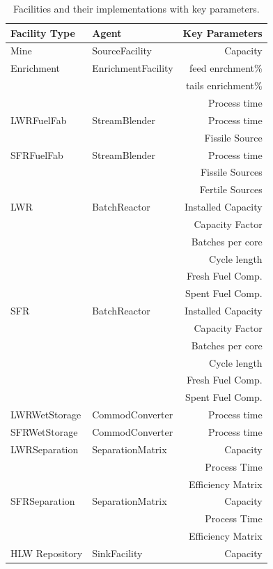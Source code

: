 \begin{table}
\centering
\begin{tabular}{|l|l|r|}
\hline
\textbf{Facility Type} &\textbf{Agent} & \textbf{Key Parameters}\\
\hline
Mine & SourceFacility & Capacity\\
\hline
Enrichment & EnrichmentFacility & feed enrchment\% \\
& & tails enrichment\% \\
& & Process time \\
\hline
LWRFuelFab & StreamBlender & Process time\\
& & Fissile Source\\
\hline
SFRFuelFab & StreamBlender  & Process time\\
& & Fissile Sources\\
& & Fertile Sources\\
\hline
LWR & BatchReactor & Installed Capacity \\
& & Capacity Factor \\
& & Batches per core \\ 
& & Cycle length\\
& & Fresh Fuel Comp. \\
& & Spent Fuel Comp. \\
\hline
SFR & BatchReactor & Installed Capacity\\
& & Capacity Factor \\
& & Batches per core \\ 
& & Cycle length\\
& & Fresh Fuel Comp. \\
& & Spent Fuel Comp. \\
\hline
LWRWetStorage & CommodConverter & Process time\\
\hline
SFRWetStorage & CommodConverter & Process time\\
\hline
LWRSeparation & SeparationMatrix & Capacity\\
& & Process Time\\
& & Efficiency Matrix\\
\hline
SFRSeparation & SeparationMatrix & Capacity\\
& & Process Time\\
& & Efficiency Matrix\\
\hline
HLW Repository & SinkFacility & Capacity \\
\hline
\end{tabular}
\caption{Facilities and their implementations with key parameters.}
\label{tab:facimpl}
\end{table}


